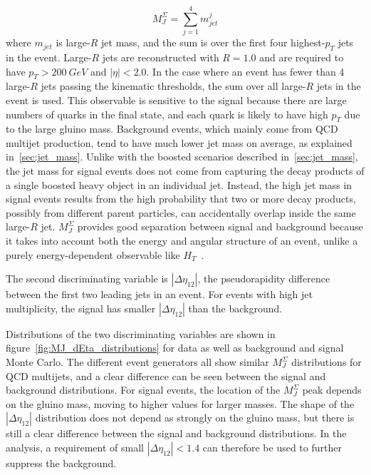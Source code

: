 \begin{equation}
    M_{J}^{\Sigma} = \sum_{j=1}^{4}m_{jet}^j
\end{equation}
where $m_{jet}$ is large-$R$ jet mass, and the sum is over the first four highest-$p_{T}$ jets in the event.
Large-$R$ jets are reconstructed with $R=1.0$ and are required to have $p_{T}>200~GeV$ and $|\eta|<2.0$.
In the case where an event has fewer than 4 large-$R$ jets passing the kinematic thresholds, the sum over all large-$R$ jets in the event is used.
This observable is sensitive to the signal because there are large numbers of quarks in the final state, and each quark is likely to have high $p_{T}$ due to the large gluino mass.
Background events, which mainly come from QCD multijet production, tend to have much lower jet mass on average, as explained in~\ref{sec:jet_mass}.
Unlike with the boosted scenarios described in~\ref{sec:jet_mass}, the jet mass for signal events does not come from capturing the decay products of a single boosted heavy object in an individual jet.
Instead, the high jet mass in signal events results from the high probability that two or more decay products, possibly from different parent particles, can accidentally overlap inside the same large-$R$ jet.
$M_{J}^{\Sigma}$ provides good separation between signal and background because it takes into account both the energy and angular structure of an event, unlike a purely energy-dependent observable like $H_{T}$~\cite{hook-mj,elhedri-mj}.

The second discriminating variable is $|\Delta \eta_{12}|$, the pseudorapidity difference between the first two leading jets in an event.
For events with high jet multiplicity, the signal has smaller $|\Delta \eta_{12}|$ than the background.

Distributions of the two discriminating variables are shown in figure~\ref{fig:MJ_dEta_distributions} for data as well as background and signal Monte Carlo.
The different event generators all show similar $M_{J}^{\Sigma}$ distributions for QCD multijets, and a clear difference can be seen between the signal and background distributions.
For signal events, the location of the $M_{J}^{\Sigma}$ peak depends on the gluino mass, moving to higher values for larger masses.
The shape of the $|\Delta \eta_{12}|$ distribution does not depend as strongly on the gluino mass, but there is still a clear difference between the signal and background distributions.
In the analysis, a requirement of small $|\Delta \eta_{12}|<1.4$ can therefore be used to further suppress the background.

